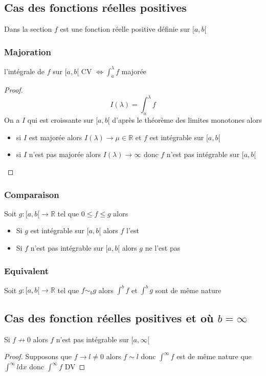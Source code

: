 \documentclass[11pt,colorlinks]{book}
\theoremstyle{mytheoremstyle}
\theoremstyle{mytheoremstyle}
\theoremstyle{mytheoremstyle}
\theoremstyle{mytheoremstyle}
\theoremstyle{mytheoremstyle}
\theoremstyle{mytheoremstyle}
\theoremstyle{mytheoremstyle}
\theoremstyle{mytheoremstyle}
\theoremstyle{myproblemstyle}
\def\mbb#1{\mathbb{#1}}
\def\bR{\mbb{R}}
\renewcommand{\equiv}{\sim}
\begin{document}
  \subsection{Cas des fonctions réelles positives}
  Dans la section $f$ est une fonction réelle positive définie sur $[a,b[$
  \subsubsection{Majoration}
  \begin{prop}
    l'intégrale de $f$ sur $[a,b[$ CV $\Leftrightarrow \int_a^{\lambda} f$ majorée
    \begin{proof}
      \begin{equation*}
        I(\lambda) = \int_{a}^{\lambda} f
      \end{equation*}
      On a $I$ qui est croissante sur $[a,b[$ d'après le théorème des limites monotones alors 
      \begin{itemize}
        \item si $I$ est majorée alors $I(\lambda) \to \mu \in \bR$ et $f$ est intégrable sur $[a,b[$
        \item si $I$ n'est pas majorée alors $I(\lambda) \to \infty$ donc $f$ n'est pas intégrable sur $[a,b[$
      \end{itemize}
    \end{proof}
  \end{prop}
  \subsubsection{Comparaison}
  \begin{prop}
    Soit $g : [a,b[ \to \bR$ tel que $0 \leq f \leq g$ alors 
    \begin{itemize}
      \item Si $g$ est intégrable sur $[a,b[$ alors $f$ l'est 
      \item Si $f$ n'est pas intégrable sur $[a,b[$ alors $g$ ne l'est pas
    \end{itemize}
  \end{prop}
  \subsubsection{Equivalent}
  \begin{prop}
    Soit $g : [a,b[ \to \bR$ tel que $f \equiv_b g$ alors $\int^b f$ et $\int^b g$ sont de même nature
  \end{prop}
  \subsection{Cas des fonction réelles positives et où $b=\infty$}
  \begin{prop}
    Si $f \not\to 0$ alors $f$ n'est pas intégrable sur $[a,\infty[$
    \begin{proof}
      Supposons que $f \to l \not= 0$ alors $f \equiv l$ donc $\int^{\infty} f$ est de même nature que $\int^{\infty} l \text{d}x$ donc 
      $\int^{\infty} f$ DV
    \end{proof}
  \end{prop}
\end{document}
